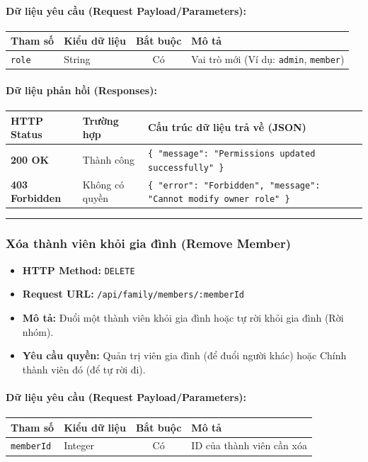 \documentclass[12pt,a4paper]{article}
\begin{document}
\paragraph{Dữ liệu yêu cầu (Request Payload/Parameters):}
\begin{longtable}{|p{2.8cm}|p{2.2cm}|c|p{7.0cm}|}
\hline
\textbf{Tham số} & \textbf{Kiểu dữ liệu} & \textbf{Bắt buộc} & \textbf{Mô tả} \\ \hline
\endhead
\texttt{role} & String & Có & Vai trò mới (Ví dụ: \texttt{admin}, \texttt{member}) \\ \hline
\end{longtable}

\paragraph{Dữ liệu phản hồi (Responses):}
\begin{longtable}{|p{2.8cm}|p{3.2cm}|p{8.0cm}|}
\hline
\textbf{HTTP Status} & \textbf{Trường hợp} & \textbf{Cấu trúc dữ liệu trả về (JSON)} \\ \hline
\endhead
\textbf{200 OK} & Thành công & \texttt{\{ "message": "Permissions updated successfully" \}} \\ \hline
\textbf{403 Forbidden} & Không có quyền & \texttt{\{ "error": "Forbidden", "message": "Cannot modify owner role" \}} \\ \hline
\end{longtable}

\vskip 0.4cm
\noindent\rule{\textwidth}{0.3pt}
\vskip 0.4cm

\subsubsection{Xóa thành viên khỏi gia đình (Remove Member)}
\begin{itemize}[leftmargin=*]
    \item \textbf{HTTP Method:} \texttt{DELETE}
    \item \textbf{Request URL:} \texttt{/api/family/members/:memberId}
    \item \textbf{Mô tả:} Đuổi một thành viên khỏi gia đình hoặc tự rời khỏi gia đình (Rời nhóm).
    \item \textbf{Yêu cầu quyền:} Quản trị viên gia đình (để đuổi người khác) hoặc Chính thành viên đó (để tự rời đi).
\end{itemize}

\paragraph{Dữ liệu yêu cầu (Request Payload/Parameters):}
\begin{longtable}{|p{2.8cm}|p{2.2cm}|c|p{7.0cm}|}
\hline
\textbf{Tham số} & \textbf{Kiểu dữ liệu} & \textbf{Bắt buộc} & \textbf{Mô tả} \\ \hline
\endhead
\texttt{memberId} & Integer & Có & ID của thành viên cần xóa \\ \hline
\end{longtable}
\end{document}
